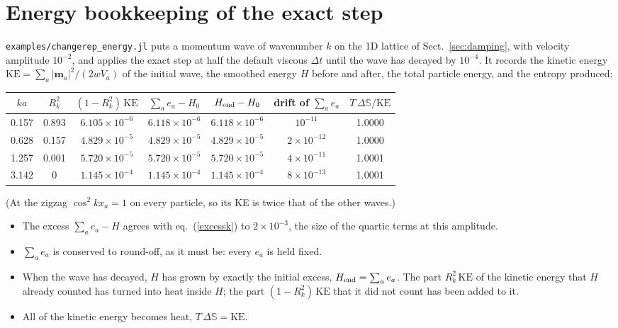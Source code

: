 \documentclass[11pt,aps,preprint,nofootinbib,superscriptaddress,tightenlines]{revtex4-2}
\def\Eq#1{eq.~(\ref{#1})}
\def\Sect#1{Sect.~\ref{#1}}
\begin{document}
\section{Energy bookkeeping of the exact step}
\label{sec:energycheck}

\texttt{examples/changerep\_energy.jl} puts a momentum wave of wavenumber $k$ on
the 1D lattice of \Sect{sec:damping}, with velocity amplitude $10^{-2}$, and
applies the exact step at half the default viscous $\Delta t$ until the wave has
decayed by $10^{-4}$.  It records the kinetic energy
$\mathrm{KE}=\sum_a|\bm m_a|^2/(2wV_a)$ of the initial wave, the smoothed energy
$H$ before and after, the total particle energy, and the entropy produced:
\begin{center}
\begin{tabular}{c c | c c c | c c}
\hline\hline
$ka$ & $R_k^2$ & $(1-R_k^2)\,\mathrm{KE}$ & $\sum_ae_a-H_0$ & $H_{\rm end}-H_0$ &
drift of $\sum_ae_a$ & $T\,\Delta\mathbb S/\mathrm{KE}$\\
\hline
0.157 & 0.893 & $6.105\times10^{-6}$ & $6.118\times10^{-6}$ & $6.118\times10^{-6}$ & $10^{-11}$ & 1.0000\\
0.628 & 0.157 & $4.829\times10^{-5}$ & $4.829\times10^{-5}$ & $4.829\times10^{-5}$ & $2\times10^{-12}$ & 1.0000\\
1.257 & 0.001 & $5.720\times10^{-5}$ & $5.720\times10^{-5}$ & $5.720\times10^{-5}$ & $4\times10^{-11}$ & 1.0001\\
3.142 & 0     & $1.145\times10^{-4}$ & $1.145\times10^{-4}$ & $1.145\times10^{-4}$ & $8\times10^{-13}$ & 1.0001\\
\hline\hline
\end{tabular}
\end{center}
(At the zigzag $\cos^2kx_a=1$ on every particle, so its KE is twice that of the
other waves.)
\begin{itemize}
\item The excess $\sum_ae_a-H$ agrees with \Eq{excessk} to $2\times10^{-3}$, the
  size of the quartic terms at this amplitude.
\item $\sum_ae_a$ is conserved to round-off, as it must be: every $e_a$ is held
  fixed.
\item When the wave has decayed, $H$ has grown by exactly the initial excess,
  $H_{\rm end}=\sum_ae_a$.  The part $R_k^2\,\mathrm{KE}$ of the kinetic energy
  that $H$ already counted has turned into heat inside $H$; the part
  $(1-R_k^2)\,\mathrm{KE}$ that it did not count has been added to it.
\item All of the kinetic energy becomes heat, $T\,\Delta\mathbb S=\mathrm{KE}$.
\end{itemize}
\end{document}
